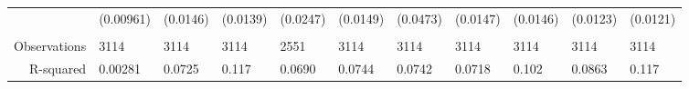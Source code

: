 \begin{tabular}{rrrrrrrrrrr}
      & \multicolumn{1}{l}{(0.00961)} & \multicolumn{1}{l}{(0.0146)} & \multicolumn{1}{l}{(0.0139)} & \multicolumn{1}{l}{(0.0247)} & \multicolumn{1}{l}{(0.0149)} & \multicolumn{1}{l}{(0.0473)} & \multicolumn{1}{l}{(0.0147)} & \multicolumn{1}{l}{(0.0146)} & \multicolumn{1}{l}{(0.0123)} & \multicolumn{1}{l}{(0.0121)} \\
      & \multicolumn{1}{l}{} & \multicolumn{1}{l}{} & \multicolumn{1}{l}{} & \multicolumn{1}{l}{} & \multicolumn{1}{l}{} & \multicolumn{1}{l}{} & \multicolumn{1}{l}{} & \multicolumn{1}{l}{} & \multicolumn{1}{l}{} & \multicolumn{1}{l}{} \\
      \midrule
Observations & \multicolumn{1}{l}{3114} & \multicolumn{1}{l}{3114} & \multicolumn{1}{l}{3114} & \multicolumn{1}{l}{2551} & \multicolumn{1}{l}{3114} & \multicolumn{1}{l}{3114} & \multicolumn{1}{l}{3114} & \multicolumn{1}{l}{3114} & \multicolumn{1}{l}{3114} & \multicolumn{1}{l}{3114} \\
R-squared & \multicolumn{1}{l}{0.00281} & \multicolumn{1}{l}{0.0725} & \multicolumn{1}{l}{0.117} & \multicolumn{1}{l}{0.0690} & \multicolumn{1}{l}{0.0744} & \multicolumn{1}{l}{0.0742} & \multicolumn{1}{l}{0.0718} & \multicolumn{1}{l}{0.102} & \multicolumn{1}{l}{0.0863} & \multicolumn{1}{l}{0.117} \\
\bottomrule
\end{tabular}%
